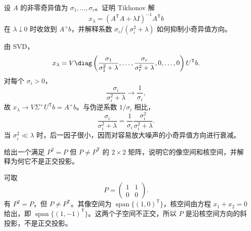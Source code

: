 \begin{exercise}[level=advanced]
设 $A$ 的非零奇异值为 $\sigma_1,\ldots,\sigma_r$。证明 Tikhonov 解
\[
x_\lambda=(A^{\mathsf T}A+\lambda I)^{-1}A^{\mathsf T}b
\]
在 $\lambda\downarrow0$ 时收敛到 $A^+b$，并解释系数
$\sigma_i/(\sigma_i^2+\lambda)$ 如何抑制小奇异值方向。
\begin{solution}
由 SVD，
\[
x_\lambda
=V\diag\left(
\frac{\sigma_1}{\sigma_1^2+\lambda},\ldots,
\frac{\sigma_r}{\sigma_r^2+\lambda},0,\ldots,0
\right)U^{\mathsf T}b.
\]
对每个 $\sigma_i>0$，
\[
\frac{\sigma_i}{\sigma_i^2+\lambda}
\longrightarrow\frac1{\sigma_i},
\]
故 $x_\lambda\to V\Sigma^+U^{\mathsf T}b=A^+b$。与伪逆系数 $1/\sigma_i$ 相比，
\[
\frac{\sigma_i}{\sigma_i^2+\lambda}
=\frac1{\sigma_i}\frac{\sigma_i^2}{\sigma_i^2+\lambda}.
\]
当 $\sigma_i^2\ll\lambda$ 时，后一因子很小，因而对容易放大噪声的小奇异值方向进行衰减。
\end{solution}
\end{exercise}

\begin{exercise}[level=advanced]
给出一个满足 $P^2=P$ 但 $P\ne P^{\mathsf T}$ 的 $2\times2$ 矩阵，说明它的像空间和核空间，并解释为何它不是正交投影。
\begin{solution}
可取
\[
P=\begin{pmatrix}1&1\\0&0\end{pmatrix}.
\]
有 $P^2=P$，但 $P\ne P^{\mathsf T}$。其像空间为
$\operatorname{span}\{(1,0)^{\mathsf T}\}$，核空间由方程 $x_1+x_2=0$ 给出，即
$\operatorname{span}\{(1,-1)^{\mathsf T}\}$。这两个子空间不正交，所以 $P$ 是沿核空间方向的斜投影，不是正交投影。
\end{solution}
\end{exercise}

